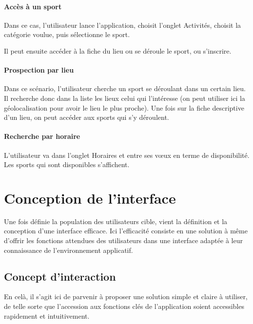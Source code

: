 \documentclass{article}
\begin{document}
        \paragraph{Accès à un sport}

            Dans ce cas, l'utilisateur lance l'application, choisit l'onglet
            Activités, choisit la catégorie voulue, puis sélectionne le sport.

            Il peut ensuite accéder à la fiche du lieu ou se déroule le sport, ou s'inscrire.

        \paragraph{Prospection par lieu}

            Dans ce scénario, l'utilisateur cherche un sport se déroulant dans un
            certain lieu. Il recherche donc dans la liste les lieux celui qui
            l'intéresse (on peut utiliser ici la géolocalisation pour avoir le
            lieu le plus proche). Une fois sur la fiche descriptive d'un lieu,
            on peut accéder aux sports qui s'y déroulent.

        \paragraph{Recherche par horaire}

            L'utilisateur va dans l'onglet \og Horaires\fg{} et entre ses vœux
            en terme de disponibilité. Les sports qui sont disponibles s'affichent.

\section{Conception de l'interface}

Une fois définie la population des utilisateurs cible, vient la définition et la
conception d'une interface efficace.
Ici l'efficacité consiste en une solution à même d'offrir les fonctions
attendues des utilisateurs dans une interface adaptée à leur connaissance de
l'environnement applicatif.

	\subsection{Concept d'interaction}

	En celà, il s'agit ici de parvenir à proposer une solution simple et claire à
	utiliser, de telle sorte que l'accession aux fonctions clés de l'application
	soient accessibles rapidement et intuitivement.
\end{document}
